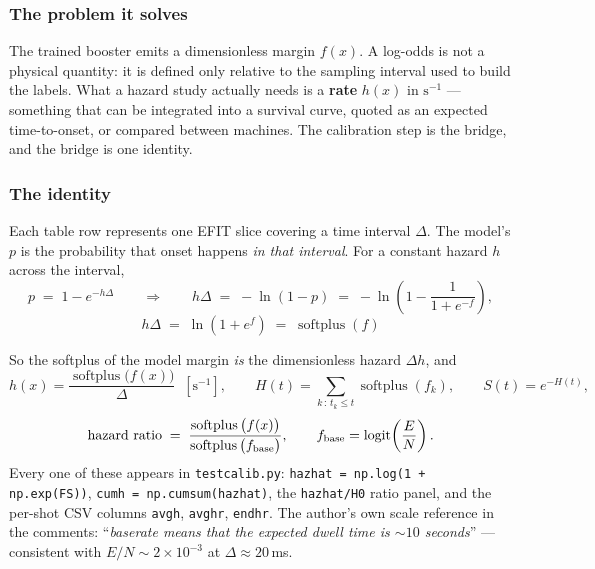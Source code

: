 \documentclass[11pt,a4paper]{article}
\newcommand{\code}[1]{\texttt{\small #1}}
\newcommand{\softplus}{\operatorname{softplus}}
\newcommand{\logit}{\operatorname{logit}}
\begin{document}
\subsubsection*{The problem it solves}

The trained booster emits a dimensionless margin $f(x)$. A log-odds is not a physical quantity: it
is defined only relative to the sampling interval used to build the labels. What a hazard study
actually needs is a \textbf{rate} $h(x)$ in $\mathrm{s}^{-1}$ --- something that can be integrated
into a survival curve, quoted as an expected time-to-onset, or compared between machines. The
calibration step is the bridge, and the bridge is one identity.

\subsubsection*{The identity}

Each table row represents one EFIT slice covering a time interval $\Delta$. The model's $p$ is the
probability that onset happens \emph{in that interval}. For a constant hazard $h$ across the interval,
\begin{equation}
p \;=\; 1 - e^{-h\Delta}
\qquad\Longrightarrow\qquad
h\Delta \;=\; -\ln(1-p) \;=\; -\ln\!\left(1 - \frac{1}{1+e^{-f}}\right),
\end{equation}
\begin{equation}
\boxed{\;h\Delta \;=\; \ln\!\left(1+e^{f}\right) \;=\; \softplus(f)\;}
\label{eq:link}
\end{equation}

So the softplus of the model margin \emph{is} the dimensionless hazard $\Delta h$, and
\begin{equation}
h(x) = \frac{\softplus\big(f(x)\big)}{\Delta} \;\;[\mathrm{s}^{-1}],
\qquad
H(t) = \sum_{k\,:\,t_k \le t}\softplus(f_k),
\qquad
S(t) = e^{-H(t)},
\end{equation}
\begin{equation}
\text{hazard ratio} \;=\; \frac{\softplus\big(f(x)\big)}{\softplus\big(f_{\rm base}\big)},
\qquad
f_{\rm base} = \logit\!\left(\frac{E}{N}\right).
\end{equation}
Every one of these appears in \code{testcalib.py}: \code{hazhat = np.log(1 + np.exp(FS))},
\code{cumh = np.cumsum(hazhat)}, the \code{hazhat/H0} ratio panel, and the per-shot CSV columns
\code{avgh}, \code{avghr}, \code{endhr}. The author's own scale reference in the comments:
``\emph{baserate means that the expected dwell time is $\sim 10$ seconds}'' --- consistent with
$E/N \sim 2\times10^{-3}$ at $\Delta \approx 20$\,ms.
\end{document}
